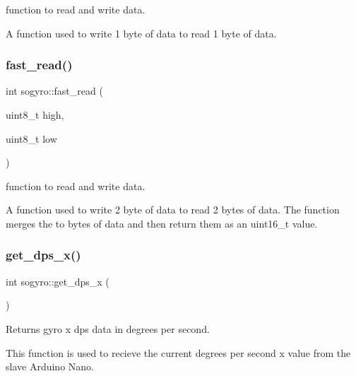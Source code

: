 function to read and write data. 

A function used to write 1 byte of data to read 1 byte of data. \mbox{\label{classsogyro_a65a601a9536aefcad18969ef5969fe11}} 
\subsubsection{\texorpdfstring{fast\+\_\+read()}{fast\_read()}\hspace{0.1cm}{\footnotesize\ttfamily [2/2]}}
{\footnotesize\ttfamily int sogyro\+::fast\+\_\+read (\begin{DoxyParamCaption}\item[{uint8\+\_\+t}]{high,  }\item[{uint8\+\_\+t}]{low }\end{DoxyParamCaption})\hspace{0.3cm}{\ttfamily [inline]}}



function to read and write data. 

A function used to write 2 byte of data to read 2 bytes of data. The function merges the to bytes of data and then return them as an uint16\+\_\+t value. \mbox{\label{classsogyro_acad639f73b31704bd60dcb81ca4d8ed1}} 
\subsubsection{\texorpdfstring{get\+\_\+dps\+\_\+x()}{get\_dps\_x()}}
{\footnotesize\ttfamily int sogyro\+::get\+\_\+dps\+\_\+x (\begin{DoxyParamCaption}{ }\end{DoxyParamCaption})\hspace{0.3cm}{\ttfamily [inline]}}



Returns gyro x dps data in degrees per second. 

This function is used to recieve the current degrees per second x value from the slave Arduino Nano. \mbox{\label{classsogyro_add0d7fc633b0410127e243f2eba19f2d}} 
